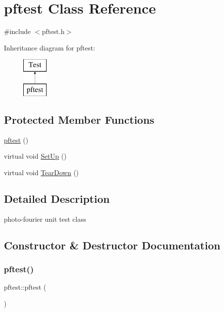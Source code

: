 \hypertarget{classpftest}{}\section{pftest Class Reference}
\label{classpftest}


{\ttfamily \#include $<$pftest.\+h$>$}

Inheritance diagram for pftest\+:\begin{figure}[H]
\begin{center}
\leavevmode
\includegraphics[height=2.000000cm]{classpftest}
\end{center}
\end{figure}
\subsection*{Protected Member Functions}
\begin{DoxyCompactItemize}
\item 
\mbox{\hyperlink{classpftest_a5fd8e4ad4c44d036f30b897b14fcf976}{pftest}} ()
\item 
virtual void \mbox{\hyperlink{classpftest_ae22f0b960c3e3814bef9e84eac73130f}{Set\+Up}} ()
\item 
virtual void \mbox{\hyperlink{classpftest_a9cf3baf9ba834e229c0b47d83c48167f}{Tear\+Down}} ()
\end{DoxyCompactItemize}


\subsection{Detailed Description}
photo-\/fourier unit test class 

\subsection{Constructor \& Destructor Documentation}
\mbox{\label{classpftest_a5fd8e4ad4c44d036f30b897b14fcf976}} 
\subsubsection{\texorpdfstring{pftest()}{pftest()}}
{\footnotesize\ttfamily pftest\+::pftest (\begin{DoxyParamCaption}{ }\end{DoxyParamCaption})\hspace{0.3cm}{\ttfamily [protected]}}

